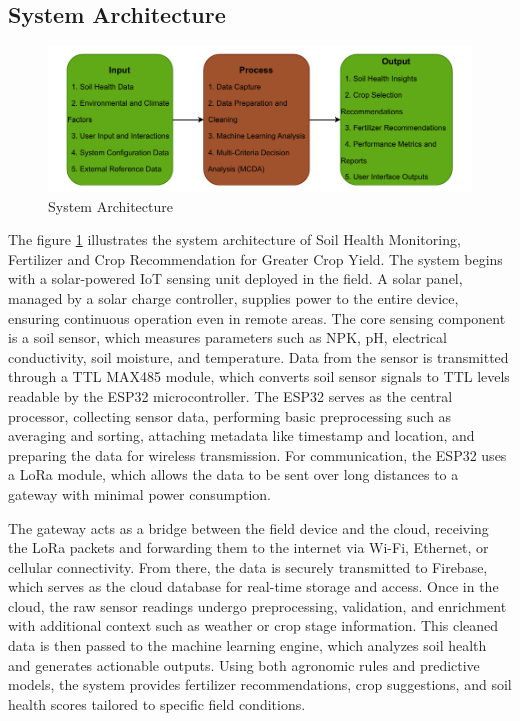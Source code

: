 {	\subsection{System Architecture}
	\begin{figure}[H]
		\centering
		\caption{System Architecture}
		\label{fig:SystemArchitecture}
		\includegraphics[width=1\textwidth]{figures/IPO.pdf}
	\end{figure}
	
	The figure \ref{fig:SystemArchitecture} illustrates the system architecture of Soil Health Monitoring, Fertilizer and Crop Recommendation for Greater Crop Yield. The system begins with a solar-powered IoT sensing unit deployed in the field. A solar panel, managed by a solar charge controller, supplies power to the entire device, ensuring continuous operation even in remote areas. The core sensing component is a soil sensor, which measures parameters such as NPK, pH, electrical conductivity, soil moisture, and temperature. Data from the sensor is transmitted through a TTL MAX485 module, which converts soil sensor signals to TTL levels readable by the ESP32 microcontroller. The ESP32 serves as the central processor, collecting sensor data, performing basic preprocessing such as averaging and sorting, attaching metadata like timestamp and location, and preparing the data for wireless transmission. For communication, the ESP32 uses a LoRa module, which allows the data to be sent over long distances to a gateway with minimal power consumption.
	
	The gateway acts as a bridge between the field device and the cloud, receiving the LoRa packets and forwarding them to the internet via Wi-Fi, Ethernet, or cellular connectivity. From there, the data is securely transmitted to Firebase, which serves as the cloud database for real-time storage and access. Once in the cloud, the raw sensor readings undergo preprocessing, validation, and enrichment with additional context such as weather or crop stage information. This cleaned data is then passed to the machine learning engine, which analyzes soil health and generates actionable outputs. Using both agronomic rules and predictive models, the system provides fertilizer recommendations, crop suggestions, and soil health scores tailored to specific field conditions.
	
}
